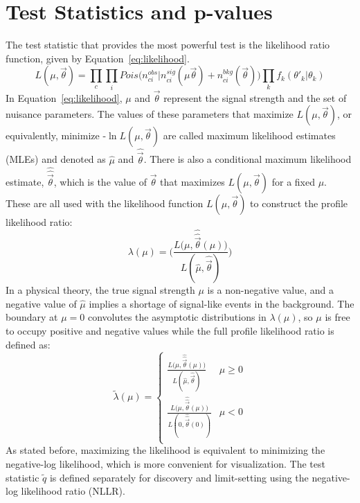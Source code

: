 \section{Test Statistics and p-values}
\label{sec:statanal:pval}
The test statistic that provides the most powerful test is the likelihood ratio function, given by Equation~\ref{eq:likelihood}.
\begin{equation}
L(\mu,\vec{\theta})=\prod_c\prod_iPois\big(n_{ci}^{obs}|n_{ci}^{sig}(\mu\vec{\theta})+n_{ci}^{bkg}(\vec{\theta})\big)\prod_kf_k(\theta'_k|\theta_k)
\label{eq:likelihood}
\end{equation}
In Equation~\ref{eq:likelihood}, $\mu$ and $\vec{\theta}$ represent the signal strength and the set of nuisance parameters.  The values of these parameters that maximize $L(\mu,\vec{\theta})$, or equivalently, minimize -$\ln L(\mu,\vec{\theta})$ are called maximum likelihood estimates (MLEs) and denoted as $\hat{\mu}$ and $\hat{\vec{\theta}}$.  There is also a conditional maximum likelihood estimate, $\hat{\hat{\vec{\theta}}}$, which is the value of $\vec{\theta}$ that maximizes $L(\mu,\vec{\theta})$ for a fixed $\mu$.  These are all used with the likelihood function $L(\mu,\vec{\theta})$ to construct the profile likelihood ratio:
\begin{equation}
\lambda(\mu)=\bigg(\frac{L\big(\mu,\hat{\hat{\vec{\theta}}}(\mu)\big)}{L(\hat{\mu},\hat{\vec{\theta}})}\bigg)
\end{equation}
In a physical theory, the true signal strength $\mu$ is a non-negative value, and a negative value of $\hat{\mu}$ implies a shortage of signal-like events in the background.  The boundary at $\mu=0$ convolutes the asymptotic distributions in $\lambda(\mu)$, so $\mu$ is free to occupy positive and negative values while the full profile likelihood ratio is defined as:
\begin{equation}
\tilde{\lambda}(\mu)=
 \begin{cases} 
      \frac{L\big(\mu,\hat{\hat{\vec{\theta}}}(\mu)\big)}{L(\hat{\mu},\hat{\vec{\theta}})} & \hat{\mu}\geq 0 \\
      \frac{L\big(\mu,\hat{\hat{\vec{\theta}}}(\mu)\big)}{L(0,\hat{\hat{\vec{\theta}}}(0))} & \hat{\mu}< 0 \\
   \end{cases}
\end{equation}
As stated before, maximizing the likelihood is equivalent to minimizing the negative-log likelihood, which is more convenient for visualization.  The test statistic $\tilde{q}$ is defined separately for discovery and limit-setting using the negative-log likelihood ratio (NLLR).  

